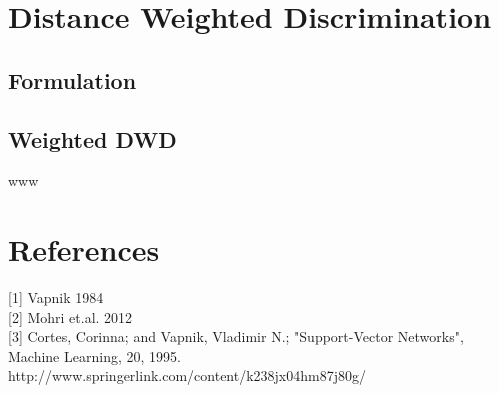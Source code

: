 \documentclass[12pt]{article}
\theoremstyle{definition}
\theoremstyle{remark}
\numberwithin{equation}{section}
\begin{document}
\section{Distance Weighted Discrimination}
\subsection{Formulation}
\subsection{Weighted DWD}
www

\section{References}
[1] Vapnik 1984 \\[0.2cm]
[2] Mohri et.al. 2012 \\ [0.2cm]
[3] Cortes, Corinna; and Vapnik, Vladimir N.; "Support-Vector Networks", Machine Learning, 20, 1995.\\ http://www.springerlink.com/content/k238jx04hm87j80g/
\end{document}
